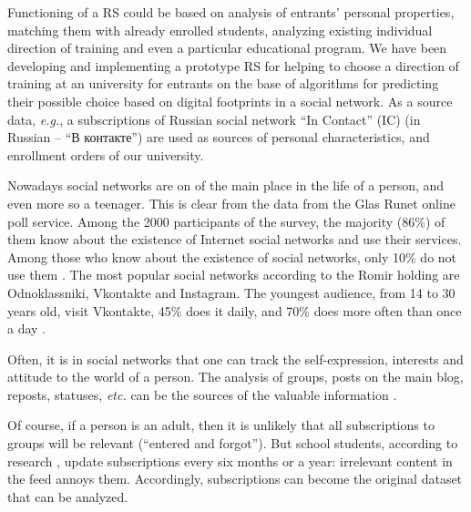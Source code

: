 \documentclass[conference]{IEEEtran}
\begin{document}
Functioning of a RS could be based on analysis of entrants' personal properties, matching them with already enrolled students, analyzing existing individual direction of training and even a particular educational program.  We have been developing and implementing a prototype RS for helping to choose a direction of training at an university for entrants on the base of algorithms for predicting their possible choice based on digital footprints in a social network. As a source data, \emph{e.g.}, a subscriptions of Russian social network ``In Contact'' (IC) (in Russian -- ``В контакте'') are used as sources of personal characteristics, and enrollment orders of our university.  %

Nowadays social networks are on of the main place in the life of a person, and even more so a teenager.  This is clear from the data from the Glas Runet online poll service.  Among the 2000 participants of the survey, the majority (86\%) of them know about the existence of Internet social networks and use their services.  Among those who know about the existence of social networks, only 10\% do not use them \cite{c2}.
The most popular social networks according to the Romir holding are Odnoklassniki, Vkontakte and Instagram.  The youngest audience, from 14 to 30 years old, visit Vkontakte, 45\% does it daily, and 70\% does more often than once a day \cite{c6}.

Often, it is in social networks that one can track the self-expression, interests and attitude to the world of a person. The analysis of groups, posts on the main blog, reposts, statuses, \emph{etc.} can be the sources of the valuable information \cite{c7}.

Of course, if a person is an adult, then it is unlikely that all subscriptions to groups will be relevant (``entered and forgot'').  But school students, according to research \cite{11}, update subscriptions every six months or a year: irrelevant content in the feed annoys them.  Accordingly, subscriptions can become the original dataset that can be analyzed.
\end{document}
